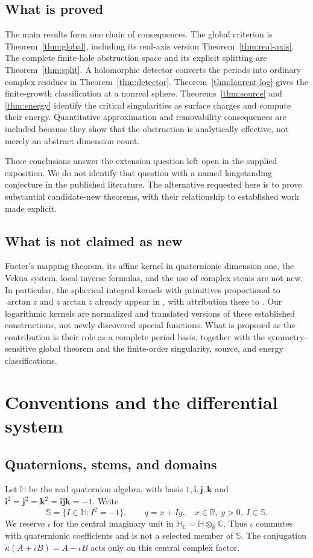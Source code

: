 \documentclass[11pt,a4paper]{article}
\numberwithin{equation}{section}
\theoremstyle{definition}
\theoremstyle{remark}
\newcommand{\R}{\mathbb R}
\newcommand{\C}{\mathbb C}
\newcommand{\HH}{\mathbb H}
\newcommand{\HC}{\mathbb H_{\C}}
\newcommand{\SSS}{\mathbb S}
\newcommand{\ii}{\mathbf i}
\newcommand{\jj}{\mathbf j}
\newcommand{\kk}{\mathbf k}
\begin{document}
\subsection{What is proved}
The main results form one chain of consequences. The global criterion is
Theorem~\ref{thm:global}, including its real-axis version
Theorem~\ref{thm:real-axis}. The complete finite-hole obstruction space and its
explicit splitting are Theorem~\ref{thm:split}. A holomorphic detector converts
the periods into ordinary complex residues in
Theorem~\ref{thm:detector}. Theorem~\ref{thm:laurent-log} gives the finite-growth
classification at a nonreal sphere. Theorems~\ref{thm:source} and
\ref{thm:energy} identify the critical singularities as surface charges and
compute their energy. Quantitative approximation and removability consequences
are included because they show that the obstruction is analytically effective,
not merely an abstract dimension count.

These conclusions answer the extension question left open in the supplied
exposition. We do not identify that question with a named longstanding
conjecture in the published literature. The alternative requested here is to
prove substantial candidate-new theorems, with their relationship to established
work made explicit.

\subsection{What is not claimed as new}
Fueter's mapping theorem, its affine kernel in quaternionic dimension one,
the Vekua system, local inverse formulas, and the use of complex stems are not
new. In particular, the spherical integral kernels with primitives proportional
to $\arctan z$ and $z\arctan z$ already appear in \cite[Example~2]{CPSS}, with
attribution there to \cite{CSS}. Our logarithmic kernels are normalized and
translated versions of these established constructions, not newly discovered
special functions. What is proposed as the contribution is their role as a
complete period basis, together with the symmetry-sensitive global theorem and
the finite-order singularity, source, and energy classifications.

\section{Conventions and the differential system}
\label{sec:preliminaries}

\subsection{Quaternions, stems, and domains}
Let $\HH$ be the real quaternion algebra, with basis $1,\ii,\jj,\kk$ and
$\ii^2=\jj^2=\kk^2=\ii\jj\kk=-1$. Write
\[
 \SSS=\{I\in\HH:I^2=-1\},\qquad q=x+Iy,
 \quad x\in\R,\ y>0,\ I\in\SSS.
\]
We reserve $\iota$ for the central imaginary unit in
$\HC=\HH\otimes_{\R}\C$. Thus $\iota$ commutes with quaternionic coefficients
and is not a selected member of $\SSS$. The conjugation
$\kappa(A+\iota B)=A-\iota B$ acts only on this central complex factor.
\end{document}
